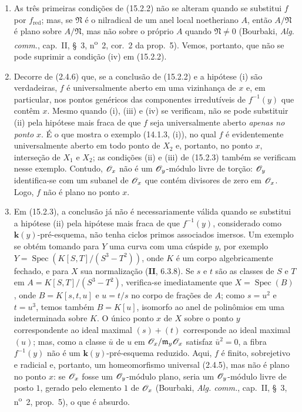 \begin{remarks}[15.2.4]
\label{IV.15.2.4}
\begin{enumerate}[label=(\roman*)]
  \item As três primeiras condições de (15.2.2) não se alteram quando se substitui $f$ por $f_{\mathrm{red}}$; mas, se $\mathfrak N$ é o nilradical de um anel local noetheriano $A$, então $A/\mathfrak N$ é plano sobre $A/\mathfrak N$, mas não sobre o próprio $A$ quando $\mathfrak N\ne0$ (Bourbaki, \emph{Alg. comm.}, cap.~II, \S~3, n\textsuperscript{o}~2, cor.~2 da prop.~5). Vemos, portanto, que não se pode suprimir a condição (iv) em (15.2.2).

  \item Decorre de (2.4.6) que, se a conclusão de (15.2.2) e a hipótese (i) são verdadeiras, $f$ é universalmente aberto em uma vizinhança de $x$ e, em particular, nos pontos genéricos das componentes irredutíveis de $f^{-1}(y)$ que contêm $x$. Mesmo quando (i), (iii) e (iv) se verificam, não se pode substituir (ii) pela hipótese mais fraca de que $f$ seja universalmente aberto \emph{apenas no ponto $x$}. É o que mostra o exemplo (14.1.3, (i)), no qual $f$ é evidentemente universalmente aberto em todo ponto de $X_2$ e, portanto, no ponto $x$, interseção de $X_1$ e $X_2$; as condições (ii) e (iii) de (15.2.3) também se verificam nesse exemplo. Contudo, $\mathscr{O}_x$ não é um $\mathscr{O}_y$-módulo livre de torção: $\mathscr{O}_y$ identifica-se com um subanel de $\mathscr{O}_x$ que contém divisores de zero em $\mathscr{O}_x$. Logo, $f$ não é plano no ponto $x$.

  \item Em (15.2.3), a conclusão já não é necessariamente válida quando se substitui a hipótese (ii) pela hipótese mais fraca de que $f^{-1}(y)$, considerado como $\mathbf{k}(y)$-pré-esquema, não tenha ciclos primos associados imersos. Um exemplo se obtém tomando para $Y$ uma curva com uma cúspide $y$, por exemplo $Y=\operatorname{Spec}(K[S,T]/(S^3-T^2))$, onde $K$ é um corpo algebricamente fechado, e para $X$ sua normalização ($\textbf{II}$, 6.3.8). Se $s$ e $t$ são as classes de $S$ e $T$ em $A=K[S,T]/(S^3-T^2)$, verifica-se imediatamente que $X=\operatorname{Spec}(B)$, onde $B=K[s,t,u]$ e $u=t/s$ no corpo de frações de $A$; como $s=u^2$ e $t=u^3$, temos também $B=K[u]$, isomorfo ao anel de polinômios em uma indeterminada sobre $K$. O único ponto $x$ de $X$ sobre o ponto $y$ correspondente ao ideal maximal $(s)+(t)$ corresponde ao ideal maximal $(u)$; mas, como a classe $\bar u$ de $u$ em $\mathscr{O}_x/\mathfrak m_y\mathscr{O}_x$ satisfaz $\bar u^2=0$, a fibra $f^{-1}(y)$ não é um $\mathbf{k}(y)$-pré-esquema reduzido. Aqui, $f$ é finito, sobrejetivo e radicial e, portanto, um homeomorfismo universal (2.4.5), mas não é plano no ponto $x$: se $\mathscr{O}_x$ fosse um $\mathscr{O}_y$-módulo plano, seria um $\mathscr{O}_y$-módulo
  livre de posto $1$, gerado pelo elemento $1$ de $\mathscr{O}_x$ (Bourbaki, \emph{Alg. comm.}, cap.~II, \S~3, n\textsuperscript{o}~2, prop.~5), o que é absurdo.


\end{enumerate}
\end{remarks}
